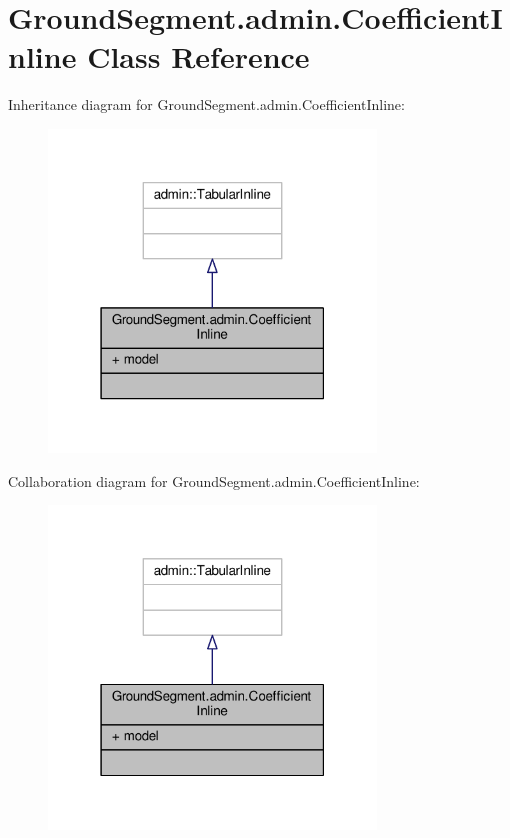 \hypertarget{class_ground_segment_1_1admin_1_1_coefficient_inline}{}\section{Ground\+Segment.\+admin.\+Coefficient\+Inline Class Reference}
\label{class_ground_segment_1_1admin_1_1_coefficient_inline}


Inheritance diagram for Ground\+Segment.\+admin.\+Coefficient\+Inline\+:\nopagebreak
\begin{figure}[H]
\begin{center}
\leavevmode
\includegraphics[width=247pt]{class_ground_segment_1_1admin_1_1_coefficient_inline__inherit__graph}
\end{center}
\end{figure}


Collaboration diagram for Ground\+Segment.\+admin.\+Coefficient\+Inline\+:\nopagebreak
\begin{figure}[H]
\begin{center}
\leavevmode
\includegraphics[width=247pt]{class_ground_segment_1_1admin_1_1_coefficient_inline__coll__graph}
\end{center}
\end{figure}
